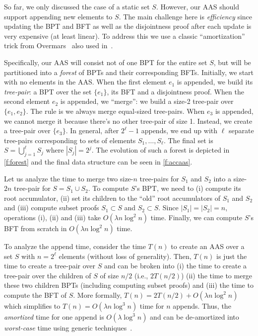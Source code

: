 So far, we only discussed the case of a static set $S$.
However, our AAS should support appending new elements to $S$. 
The main challenge here is \emph{efficiency} since updating the BPT and BFT as well as the disjointness proof after each update is very expensive (at least linear).
To address this we use a classic ``amortization'' trick from Overmars~\cite{overmars} also used in~\cite{distributed-acc}. 

Specifically, our AAS will consist not of one BPT for the entire set $S$, but will be partitioned into a \textit{forest} of BPTs and their corresponding BFTs.
Initially, we start with no elements in the AAS.
When the first element $e_1$ is appended, we build its \textit{tree-pair}: a BPT over the set $\{e_1\}$, its BFT and a disjointness proof.
When the second element $e_2$ is appended, we ``merge'': we build a size-2 tree-pair over $\{e_1, e_2\}$.
The rule is we always merge equal-sized tree-pairs.
When $e_3$ is appended, we cannot merge it because there's no other tree-pair of size 1.
Instead, we create a tree-pair over $\{e_3\}$.
In general, after $2^\ell - 1$ appends, we end up with $\ell$ separate tree-pairs corresponding to sets of elements $S_1,\dots,S_\ell$.
The final set is $S=\bigcup_{j=1}^{\ell} S_j$ where $|S_j| = 2^j$.
The evolution of such a forest is depicted in \cref{f:forest} and the final data structure can be seen in \cref{f:accaas}.

Let us analyze the time to merge two size-$n$ tree-pairs for $S_1$ and $S_2$ into a size-$2n$ tree-pair for $S=S_1 \cup S_2$.
To compute $S$'s BPT, we need to (i) compute its root accumulator, (ii) set its children to the ``old'' root accumulators of $S_1$ and $S_2$ and (iii) compute subset proofs $S_1 \subset S$ and $S_2\subset S$.
Since $|S_1|=|S_2|=n$, operations (i), (ii) and (iii) take $O(\lambda n \log^2{n})$ time.
Finally, we can compute $S$'s BFT from scratch in $O(\lambda n\log^2 n)$ time.

To analyze the append time, consider the time $T(n)$ to create an AAS over a set $S$ with $n = 2^\ell$ elements (without loss of generality).
Then, $T(n)$ is just the time to create a tree-pair over $S$ and can be broken into (i) the time to create a tree-pair over the children of $S$ of size $n/2$ (i.e., $2T(n/2)$) (ii) the time to merge these two children BPTs (including computing subset proofs) and (iii) the time to compute the BFT of $S$.
More formally, $T(n) = 2T(n/2) + O(\lambda n\log^2{n})$ which simplifies to $T(n) = O(\lambda n\log^3{n})$ time for $n$ appends.
Thus, the \textit{amortized} time for one append is $O(\lambda \log^3 {n})$ and can be de-amortized into \textit{worst-case} time using generic techniques~\cite{overmars,overmars-van-leeuwen}.

